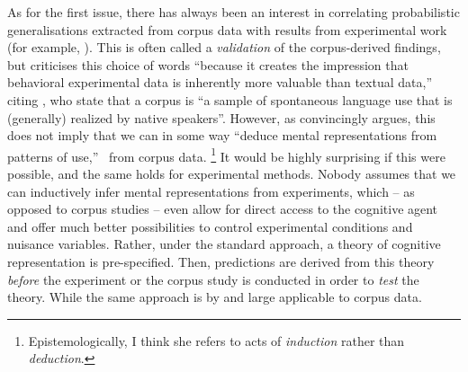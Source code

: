 As for the first issue, there has always been an interest in correlating probabilistic generalisations extracted from corpus data with results from experimental work (for example, \citealp{ArppeJaervikivi2007,BresnanEa2007,BresnanFord2010,DivjakGries2008,DivjakEa2016,FordBresnan2013}).
This is often called a \textit{validation} of the corpus-derived findings, but \citet[303]{Divjak2016a} criticises this choice of words ``because it creates the impression that behavioral experimental data is inherently more valuable than textual data,'' citing \cite{TummersEa2005}, who state that a corpus is ``a sample of spontaneous language use that is (generally) realized by native speakers''.
However, as \citet[486--487]{Dabrowska2016} convincingly argues, this does not imply that we can in some way ``deduce mental representations from patterns of use,'' \ie\ from corpus data.%
\footnote{Epistemologically, I think she refers to acts of \textit{induction} rather than \textit{deduction}.}
It would be highly surprising if this were possible, and the same holds for experimental methods.
Nobody assumes that we can inductively infer mental representations from experiments, which -- as opposed to corpus studies -- even allow for direct access to the cognitive agent and offer much better possibilities to control experimental conditions and nuisance variables.
Rather, under the standard approach, a theory of cognitive representation is pre-specified.
Then, predictions are derived from this theory \textit{before} the experiment or the corpus study is conducted in order to \textit{test} the theory.
While the same approach is by and large applicable to corpus data.

